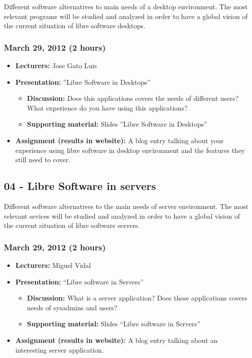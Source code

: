 \documentclass[a4paper]{article}
\begin{document}
Different software alternatives to main needs of a desktop environment. The most relevant programs will be studied and analyzed in order to have a global vision of the current situation of libre software desktops. 

\subsubsection{March 29, 2012 (2 hours)}

\begin{itemize}
\item \textbf{Lecturers:} Jose Gato Luis
\item \textbf{Presentation:} ''Libre Software in Desktops''
  \begin{itemize}
  \item \textbf{Discussion:} Does this applications covers the needs of different users? What experience do you have using this applications?
  \item \textbf{Supporting material:} Slides ''Libre Software in Desktops''
  \end{itemize}
\item \textbf{Assignment (results in website):} A blog entry talking about your experience using libre software in desktop environment and the features they still need to cover. 
\end{itemize}

\subsection{04 - Libre Software in servers}

Different software alternatives to the main needs of server environment. The most relevant sevices will be studied and analyzed in order to have a global vision of the current situation of libre software servers. 

\subsubsection{March 29, 2012 (2 hours)}

\begin{itemize}
\item \textbf{Lecturers:} Miguel Vidal
\item \textbf{Presentation:} ``Libre software in Servers''
  \begin{itemize}
  \item \textbf{Discussion:} What is a server application? Does these applications covers needs of sysadmins and users?
  \item \textbf{Supporting material:} Slides ``Libre software in Servers''
  \end{itemize}
\item \textbf{Assignment (results in website):} A blog entry talking about an interesting server application.
\end{itemize}
\end{document}
